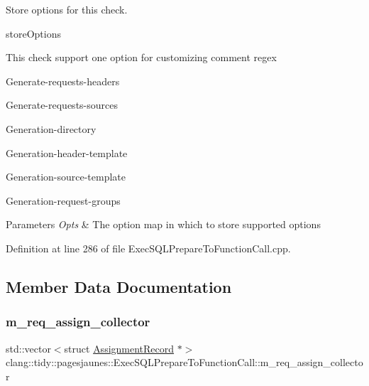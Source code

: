 Store options for this check. 

store\+Options

This check support one option for customizing comment regex
\begin{DoxyItemize}
\item Generate-\/requests-\/headers
\item Generate-\/requests-\/sources
\item Generation-\/directory
\item Generation-\/header-\/template
\item Generation-\/source-\/template
\item Generation-\/request-\/groups
\end{DoxyItemize}


\begin{DoxyParams}{Parameters}
{\em Opts} & The option map in which to store supported options \\
\hline
\end{DoxyParams}


Definition at line 286 of file Exec\+S\+Q\+L\+Prepare\+To\+Function\+Call.\+cpp.



\subsection{Member Data Documentation}
\mbox{\label{classclang_1_1tidy_1_1pagesjaunes_1_1_exec_s_q_l_prepare_to_function_call_a8c817b1b05e39f55eec0aeeebc91294d}} 
\subsubsection{\texorpdfstring{m\+\_\+req\+\_\+assign\+\_\+collector}{m\_req\_assign\_collector}}
{\footnotesize\ttfamily std\+::vector$<$struct \hyperlink{structclang_1_1tidy_1_1pagesjaunes_1_1_exec_s_q_l_prepare_to_function_call_1_1_assignment_record}{Assignment\+Record} $\ast$$>$ clang\+::tidy\+::pagesjaunes\+::\+Exec\+S\+Q\+L\+Prepare\+To\+Function\+Call\+::m\+\_\+req\+\_\+assign\+\_\+collector\hspace{0.3cm}{\ttfamily [protected]}}



